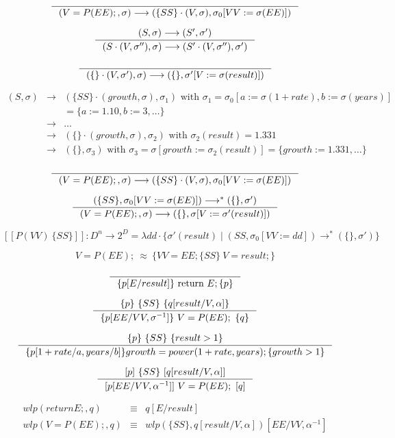 \documentclass[12pt, a4paper]{book}
\begin{document}
  $$
  \inference{}
  {(V=P(EE);, \sigma) \longrightarrow (\{SS\} \cdot (V, \sigma), \sigma_{0}[VV := \sigma(EE)])}
  $$

  $$
  \inference{(S,\sigma) \longrightarrow (S',\sigma')}
  {(S\cdot (V, \sigma''), \sigma) \longrightarrow (S'\cdot (V,\sigma''), \sigma')}
  $$

  $$
  \inference{}
  {(\{\} \cdot (V, \sigma'), \sigma) \longrightarrow (\{\}, \sigma'[V:=\sigma(result)])}
  $$

  \begin{eqnarray*}
      (S,\sigma) & \longrightarrow & (\{SS\}\cdot (growth,\sigma), \sigma_{1})\textrm{ with }\sigma_{1} = \sigma_{0}[a:=\sigma(1+rate), b:=\sigma(years)] \\
      & & = \{a := 1.10, b:=3,\ldots\} \\
      & \longrightarrow & \ldots \\
      & \longrightarrow & (\{\}\cdot (growth, \sigma), \sigma_{2})\textrm{ with }\sigma_{2}(result) = 1.331 \\
      & \longrightarrow & (\{\}, \sigma_{3})\textrm{ with }\sigma_{3} = \sigma[growth := \sigma_{2}(result)] = \{growth := 1.331, \ldots\}
  \end{eqnarray*}

  $$
  \inference{}
  {(V=P(EE);, \sigma) \longrightarrow (\{SS\}\cdot(V,\sigma), \sigma_{0}[VV:=\sigma(EE)])}
  $$

  $$
  \inference{(\{SS\}, \sigma_{0}[VV:=\sigma(EE)]) \longrightarrow^{*} (\{\}, \sigma')}
  {(V=P(EE);, \sigma) \longrightarrow (\{\}, \sigma[V:=\sigma'(result)])}
  $$

  $$
  [[P(VV)\ \{SS\}]] : D^{n} \rightarrow 2^{D} = \lambda dd \cdot \{\sigma'(result) \mid (SS, \sigma_{0}[VV:=dd]) \longrightarrow^{*} (\{\}, \sigma')\}
  $$

  $$
  V = P(EE);\ \approx\ \{VV=EE; \{SS\}\ V=result; \}
  $$

  $$
  \inference{}
  {\{p[E/result]\}\textrm{ return }E;\{p\}}
  $$

  $$
  \inference{\{p\}\ \{SS\}\ \{q[result/V, \alpha]\}}
  {\{p[EE/VV, \sigma^{-1}]\}\ V=P(EE);\ \{q\}}
  $$

  $$
  \inference{\{p\}\ \{SS\}\ \{result > 1\}}
  {\{p[1+rate/a, years/b]\} growth=power(1+rate, years); \{growth > 1\}}
  $$

  $$
  \inference{[p]\ \{SS\}\ [q[result/V,\alpha]]}
  {[p[EE/VV,\alpha^{-1}]]\ V=P(EE);\ [q]}
  $$

  \begin{eqnarray*}
      wlp(return E;, q) & \equiv & q[E/result] \\
      wlp(V=P(EE);, q) & \equiv & wlp(\{SS\}, q[result/V,\alpha])[EE/VV,\alpha^{-1}]
  \end{eqnarray*}
\end{document}

